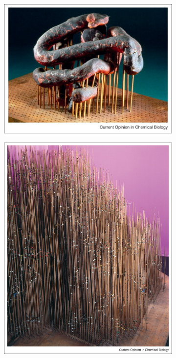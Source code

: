 \begin{figure}
  \begin{subfigure}{.5\textwidth}
  \centering
  {\includegraphics[width=0.9\linewidth]{./figures/ch1/kendrew_myoglobin_plasticine}}
    \label{Fig:kendrew_plasticine}
  \caption{}
  \end{subfigure}%
  \begin{subfigure}{.5\textwidth}
  \centering
  {\includegraphics[width=0.9\linewidth]{./figures/ch1/kendrew_myoglobin_forest_of_rods}}    

\end{subfigure}
\end{figure}
